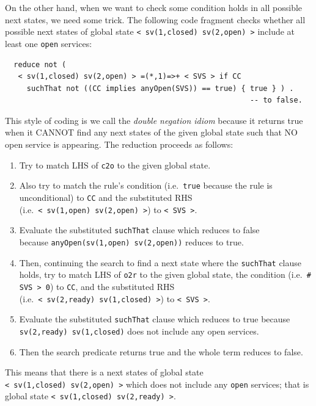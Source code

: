 \documentclass[12pt]{report}
\newcommand{\stt}[1]{{\small{\tt {#1}}}}
\begin{document}
On the other hand, when we want to check some condition holds in all
possible next states, we need some trick. The following code fragment
checks whether all possible next states of global state
\stt{<~sv(1,closed)~sv(2,open)~>} include at least one {\tt open} services:
\small
\begin{verbatim}
  reduce not (
   < sv(1,closed) sv(2,open) > =(*,1)=>+ < SVS > if CC
     suchThat not ((CC implies anyOpen(SVS)) == true) { true } ) .
                                                        -- to false.
\end{verbatim}
\normalsize
This style of coding is we call the {\it double negation idiom}
because it returns true when it CANNOT find any next states of the
given global state such that NO open service is appearing. The reduction
proceeds as follows:
\begin{enumerate}
\item Try to match LHS of {\tt c2o} to the given global state.
\item Also try to match the rule's condition (i.e.\ {\tt true} because
  the rule is unconditional) to {\tt CC} and the substituted RHS
  (i.e.\ \stt{<~sv(1,open)~sv(2,open)~>}) to \stt{<~SVS~>}.
\item Evaluate the substituted {\tt suchThat} clause which reduces to
  false \\ because \stt{anyOpen(sv(1,open) sv(2,open))} reduces to
  true.
\item Then, continuing the search to find a next state where the {\tt suchThat} clause holds,
  try to match LHS of {\tt o2r} to
  the given global state, the condition (i.e.\ \stt{\# SVS > 0}) to {\tt CC},
  and the substituted RHS (i.e.\ \stt{<~sv(2,ready)~sv(1,closed)~>}) to
  \stt{<~SVS~>}.
\item Evaluate the substituted {\tt suchThat} clause which reduces to
  true because \stt{sv(2,ready) sv(1,closed)} does not include any
  open services.
\item Then the search predicate returns true and the whole term
  reduces to false.
\end{enumerate}
This means that there is a next states of global state
\stt{<~sv(1,closed)~sv(2,open)~>} which does not include any {\tt open}
services; that is global state
\stt{<~sv(1,closed)~sv(2,ready)~>}.
\end{document}

